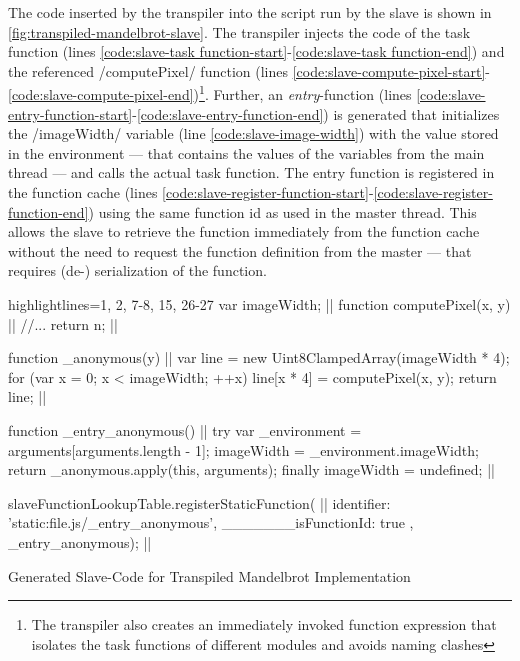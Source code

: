 The code inserted by the transpiler into the script run by the slave is shown in \cref{fig:transpiled-mandelbrot-slave}. The transpiler injects the code of the task function (lines \ref{code:slave-task function-start}-\ref{code:slave-task function-end}) and the referenced \javascriptinline/computePixel/ function (lines \ref{code:slave-compute-pixel-start}-\ref{code:slave-compute-pixel-end})\footnote{The transpiler also creates an immediately invoked function expression that isolates the task functions of different modules and avoids naming clashes}. Further, an \textit{entry}-function (lines \ref{code:slave-entry-function-start}-\ref{code:slave-entry-function-end}) is generated that initializes the \javascriptinline/imageWidth/ variable (line \ref{code:slave-image-width}) with the value stored in the environment --- that contains the values of the variables from the main thread --- and calls the actual task function. The entry function is registered in the function cache (lines \ref{code:slave-register-function-start}-\ref{code:slave-register-function-end}) using the same function id as used in the master thread. This allows the slave to retrieve the function immediately from the function cache without the need to request the function definition from the master --- that requires (de-) serialization of the function.

\begin{listing}
\begin{javascriptcode*}{highlightlines={1, 2, 7-8, 15, 26-27}}
var imageWidth; |$\label{code:slave-image-width}$|
function computePixel(x, y) { |$\label{code:slave-compute-pixel-start}$|
	//...
	return n;
}|$\label{code:slave-compute-pixel-end}$|

function _anonymous(y) { |$\label{code:slave-task function-start}$|
	var line = new Uint8ClampedArray(imageWidth * 4);
	for (var x = 0; x < imageWidth; ++x) {
		line[x * 4] = computePixel(x, y);
	}
	return line;
}|$\label{code:slave-task function-end}$|

function _entry_anonymous() { |$\label{code:slave-entry-function-start}$|
	try {
		var _environment = arguments[arguments.length - 1];
		imageWidth = _environment.imageWidth;
		return _anonymous.apply(this, arguments);
	} finally {
		imageWidth = undefined;
	}
}|$\label{code:slave-entry-function-end}$|

slaveFunctionLookupTable.registerStaticFunction({ |$\label{code:slave-register-function-start}$|
	identifier: 'static:file.js/_entry_anonymous',
	_______isFunctionId: true
}, _entry_anonymous); |$\label{code:slave-register-function-end}$|
\end{javascriptcode*}
\caption{Generated Slave-Code for Transpiled Mandelbrot Implementation}
\label{fig:transpiled-mandelbrot-slave}
\end{listing}


